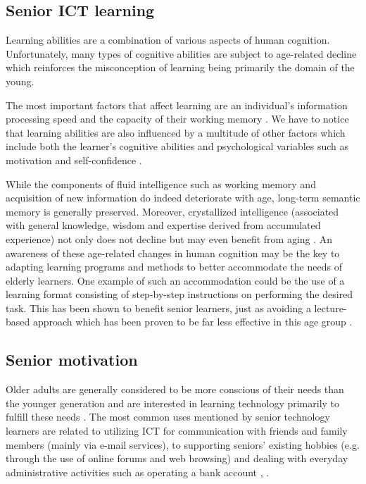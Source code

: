 \documentclass[sigconf]{acmart}
\begin{document}
\subsection{Senior ICT learning}

Learning abilities are a combination of various aspects of human cognition. Unfortunately, many types of cognitive abilities are subject to age-related decline which reinforces the misconception of learning being primarily the domain of the young.

The most important factors that affect learning are an individual's information processing speed and the capacity of their working memory \cite{gamberini_cognition_????}. We have to notice that learning abilities are also influenced by a multitude of other factors which include both the learner's cognitive abilities and psychological variables such as motivation and self-confidence \cite{boulton-lewis_ageing_????}.

While the components of fluid intelligence such as working memory and acquisition of new information do indeed deteriorate with age, long-term semantic memory is generally preserved. Moreover, crystallized intelligence (associated with general knowledge, wisdom and expertise derived from accumulated experience) not only does not decline but may even benefit from aging \cite{naumanen_guiding_????}. An awareness of these age-related changes in human cognition may be the key to adapting learning programs and methods to better accommodate the needs of elderly learners. One example of such an accommodation could be the use of a learning format consisting of step-by-step instructions on performing the desired task. This has been shown to benefit senior learners, just as avoiding a lecture-based approach which has been proven to be far less effective in this age group \cite{haeggans_60s_2012}. 

\subsection{Senior motivation}

Older adults are generally considered to be more conscious of their needs than the younger generation and are interested in learning technology primarily to fulfill these needs \cite{djoub_ict_2013}. The most common uses mentioned by senior technology learners are related to utilizing ICT for communication with friends and family members (mainly via e-mail services), to supporting seniors' existing hobbies (e.g. through the use of online forums and web browsing) and dealing with everyday administrative activities such as operating a bank account \cite{boulton-lewis_ageing_????}, \cite{naumanen_practices_2008}.
\end{document}
